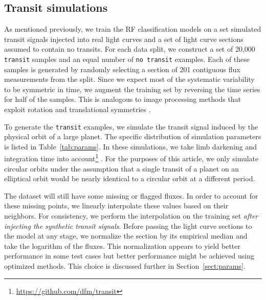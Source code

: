 \documentclass[12pt,preprint]{aastex}
\newcommand{\paper}{article}
\newcommand{\Tab}[1]{Table~\ref{tab:#1}}
\newcommand{\tab}[1]{\Tab{#1}}
\newcommand{\sectionname}{Section}
\newcommand{\sectref}[1]{\ref{sect:#1}}
\newcommand{\Sect}[1]{\sectionname~\sectref{#1}}
\newcommand{\sect}[1]{\Sect{#1}}
\begin{document}
\subsection{Transit simulations}

As mentioned previously, we train the RF classification models on a set
simulated transit signals injected into real light curves and a set of light
curve sections assumed to contain no transits.
For each data split, we construct a set of 20,000 \texttt{transit} samples and
an equal number of \texttt{no transit} examples.
Each of these samples is generated by randomly selecting a section of 201
contiguous flux measurements from the split.
Since we expect most of the systematic variability to be symmetric in time, we
augment the training set by reversing the time series for half of the samples.
This is analogous to image processing methods that exploit rotation and
translational symmetries \citep[for an example from astronomy
see][]{Dieleman:2015}.

To generate the \texttt{transit} examples, we simulate the transit signal
induced by the physical orbit of a large planet.
The specific distribution of simulation parameters is listed in \tab{params}.
In these simulations, we take limb darkening and integration time into
account\footnote{\url{https://github.com/dfm/transit}}
\citep{Mandel:2002, Kipping:2010}.
For the purposes of this \paper, we only simulate circular orbits under the
assumption that a single transit of a planet on an elliptical orbit would be
nearly identical to a circular orbit at a different period.

The dataset will still have some missing or flagged fluxes.
In order to account for these missing points, we linearly interpolate these
values based on their neighbors.
For consistency, we perform the interpolation on the training set \emph{after
injecting the synthetic transit signals}.
Before passing the light curve sections to the model at any stage, we
normalize the section by its empirical median and take the logarithm of the
fluxes.
This normalization appears to yield better performance in some test cases but
better performance might be achieved using optimized methods.
This choice is discussed further in \sect{params}.
\end{document}
